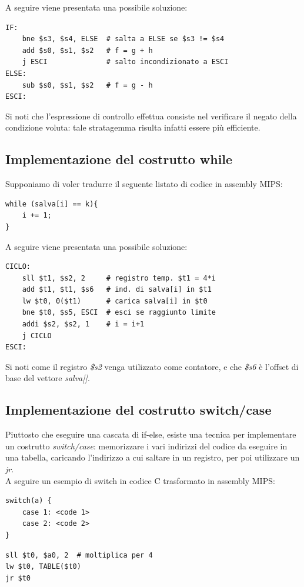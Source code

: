 \documentclass[class=book, crop=false]{standalone}
\begin{document}
A seguire viene presentata una possibile soluzione:
\begin{verbatim}
IF:
	bne $s3, $s4, ELSE  # salta a ELSE se $s3 != $s4
	add $s0, $s1, $s2   # f = g + h
	j ESCI              # salto incondizionato a ESCI
ELSE:
	sub $s0, $s1, $s2   # f = g - h
ESCI:
\end{verbatim}
Si noti che l'espressione di controllo effettua consiste nel verificare il negato della condizione voluta: tale stratagemma risulta infatti essere più efficiente.

\subsection*{Implementazione del costrutto while}
Supponiamo di voler tradurre il seguente listato di codice in assembly MIPS:
\begin{verbatim}
while (salva[i] == k){
	i += 1;
}
\end{verbatim}

A seguire viene presentata una possibile soluzione:
\begin{verbatim}
CICLO:
	sll $t1, $s2, 2     # registro temp. $t1 = 4*i
	add $t1, $t1, $s6   # ind. di salva[i] in $t1
	lw $t0, 0($t1)      # carica salva[i] in $t0
	bne $t0, $s5, ESCI  # esci se raggiunto limite
	addi $s2, $s2, 1    # i = i+1
	j CICLO
ESCI:
\end{verbatim}
Si noti come il registro \emph{\$s2} venga utilizzato come contatore, e che \emph{\$s6} è l'offset di base del vettore \emph{salva[]}.

\subsection*{Implementazione del costrutto switch/case}
Piuttosto che eseguire una cascata di if-else, esiste una tecnica per implementare un costrutto \emph{switch/case}: memorizzare i vari indirizzi del codice da eseguire in una tabella, caricando l'indirizzo a cui saltare in un registro, per poi utilizzare un \emph{jr}.\\
A seguire un esempio di switch in codice C trasformato in assembly MIPS:
\begin{verbatim}
switch(a) {
	case 1: <code 1>
	case 2: <code 2>
}
\end{verbatim}
\begin{verbatim}
sll $t0, $a0, 2  # moltiplica per 4
lw $t0, TABLE($t0)
jr $t0
\end{verbatim}
\end{document}
